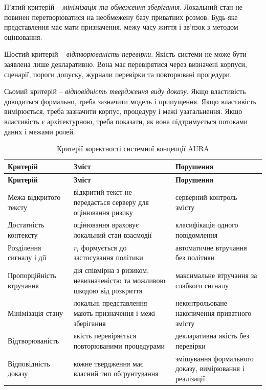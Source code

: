 П'ятий критерій -- \emph{мінімізація та обмеження зберігання}. Локальний стан не повинен перетворюватися на необмежену базу приватних розмов. Будь-яке представлення має мати призначення, межу часу життя і зв'язок з методом оцінювання.

Шостий критерій -- \emph{відтворюваність перевірки}. Якість системи не може бути заявлена лише декларативно. Вона має перевірятися через визначені корпуси, сценарії, пороги допуску, журнали перевірки та повторювані процедури.

Сьомий критерій -- \emph{відповідність твердження виду доказу}. Якщо властивість доводиться формально, треба зазначити модель і припущення. Якщо властивість вимірюється, треба зазначити корпус, процедуру і межі узагальнення. Якщо властивість є архітектурною, треба показати, як вона підтримується потоками даних і межами ролей.

\begin{longtable}{p{4.2cm} p{6.9cm} p{2.4cm}}
\caption{Критерії коректності системної концепції AURA}
\label{tab:concept-correctness}\\
\toprule
\textbf{Критерій} & \textbf{Зміст} & \textbf{Порушення} \\
\midrule
\endfirsthead
\toprule
\textbf{Критерій} & \textbf{Зміст} & \textbf{Порушення} \\
\midrule
\endhead
Межа відкритого тексту & відкритий текст не передається серверу для оцінювання ризику & серверний контроль змісту \\
Достатність контексту & оцінювання враховує локальний стан взаємодії & класифікація одного повідомлення \\
Розділення сигналу і дії & \(r_i\) формується до застосування політики & автоматичне втручання без політики \\
Пропорційність втручання & дія співмірна з ризиком, невизначеністю та можливою шкодою від розкриття & максимальне втручання за слабкого сигналу \\
Мінімізація стану & локальні представлення мають призначення і межі зберігання & неконтрольоване накопичення приватного змісту \\
Відтворюваність & якість перевіряється повторюваними процедурами & декларативна якість без перевірки \\
Відповідність доказу & кожне твердження має власний тип обґрунтування & змішування формального доказу, вимірювання і реалізації \\
\bottomrule
\end{longtable}

